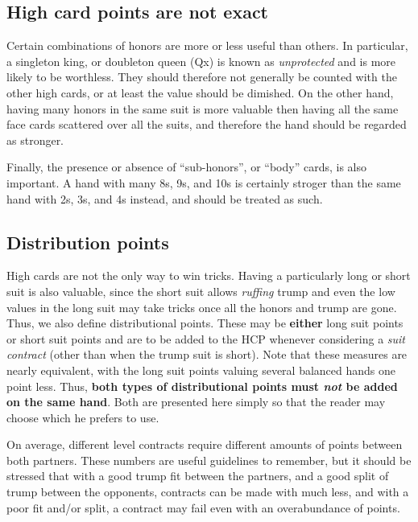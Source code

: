 \documentclass[oneside]{memoir}
\begin{document}
\subsection{High card points are not exact}
Certain combinations of honors are more or less useful than others.
In particular, a singleton king, or doubleton queen (Qx) is known as
\textit{unprotected} and is more likely to be worthless.  They should
therefore not generally be counted with the other high cards, or at least
the value should be dimished.  On the other hand, having many honors in
the same suit is more valuable then having all the same face cards scattered
over all the suits, and therefore the hand should be regarded as stronger.

Finally, the presence or absence of ``sub-honors'', or ``body'' cards, is
also important.  A hand with many 8s, 9s, and 10s is certainly stroger
than the same hand with 2s, 3s, and 4s instead, and should be treated as such.

\subsection{Distribution points}
High cards are not the only way to win tricks.  Having a particularly long
or short suit is also valuable, since the short suit allows \textit{ruffing}
trump and even the low values in the long suit may take tricks once all the
honors and trump are gone.  Thus, we also define distributional points.
These may be \textbf{either} long suit points or short suit points and are
to be added to the HCP whenever considering a \textit{suit contract} (other
than when the trump suit is short).
Note that these measures are nearly equivalent, with the long suit points
valuing several balanced hands one point less.  Thus, \textbf{both types
of distributional points must \emph{not} be added on the same hand}.  Both are
presented here simply so that the reader may choose which he prefers to use.

On average, different level contracts require different amounts of points
between both partners.  These numbers are useful guidelines to remember,
but it should be stressed that with a good trump fit between the partners,
and a good split of trump between the opponents, contracts
can be made with much less, and with a poor fit and/or split,
a contract may fail even with an overabundance of points.
\traceon
{}
\end{document}
